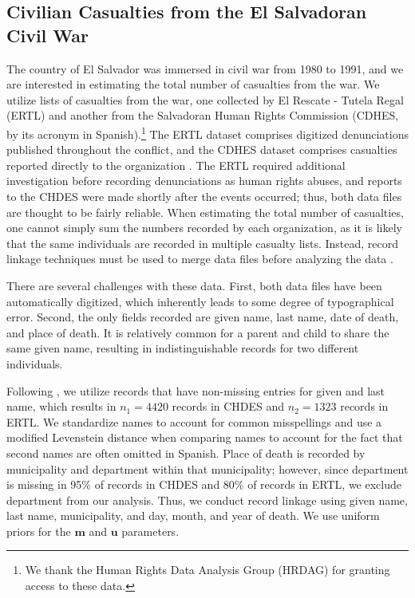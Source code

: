 \documentclass[ba]{imsart}
\begin{document}
	\subsection{Civilian Casualties from the El Salvadoran Civil War}
	\label{el_salvador}
	
	The country of El Salvador was immersed in civil war from 1980 to 1991, and we are interested in estimating the total number of casualties from the war. We utilize lists of casualties from the war, one collected by El Rescate - Tutela Regal (ERTL) and another from the Salvadoran Human Rights Commission (CDHES, by its acronym in Spanish).\footnote{We thank the Human Rights Data Analysis Group (HRDAG) for granting access to these data.} The ERTL dataset comprises digitized denunciations published throughout the conflict, and the CDHES dataset comprises casualties reported directly to the organization \citep{howland2008rescate, ball2000salvadoran}. The ERTL required additional investigation before recording denunciations as human rights abuses, and reports to the CHDES were made shortly after the events occurred; thus, both data files are thought to be fairly reliable. When estimating the total number of casualties, one cannot simply sum the numbers recorded by each organization, as it is likely that the same individuals are recorded in multiple casualty lists. Instead, record linkage techniques must be used to merge data files before analyzing the data \citep{lum2013applications}. 
	
	There are several challenges with these data. First, both data files have been automatically digitized, which inherently leads to some degree of typographical error. Second, the only fields recorded are given name, last name, date of death, and place of death. It is relatively common for a parent and child to share the same given name, resulting in indistinguishable records for two different individuals. 
	
	
	Following \cite{sadinle_bayesian_2017}, we utilize records that have non-missing entries for given and last name, which results in \(n_1 = 4420\) records in CHDES and \(n_2 = 1323\) records in ERTL. We standardize names to account for common misspellings and use a modified Levenstein distance when comparing names to account for the fact that second names are often omitted in Spanish. Place of death is recorded by municipality and department within that municipality; however, since department is missing in 95\% of records in CHDES and 80\% of records in ERTL, we exclude department from our analysis. Thus, we conduct record linkage using given name, last name, municipality, and day, month, and year of death. We use uniform priors for the \(\bm{m}\) and \(\bm{u}\) parameters.
	
\end{document}
